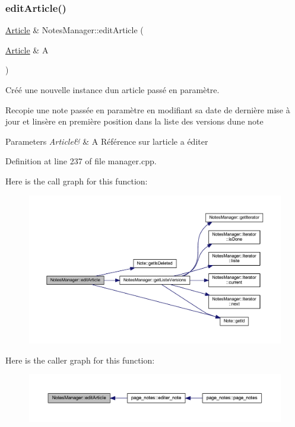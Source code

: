 \subsubsection{\texorpdfstring{edit\+Article()}{editArticle()}}
{\footnotesize\ttfamily \hyperlink{class_article}{Article} \& Notes\+Manager\+::edit\+Article (\begin{DoxyParamCaption}\item[{\hyperlink{class_article}{Article} \&}]{A }\end{DoxyParamCaption})}



Créé une nouvelle instance d\textquotesingle{}un article passé en paramètre. 

Recopie une note passée en paramètre en modifiant sa date de dernière mise à jour et l\textquotesingle{}insère en première position dans la liste des versions d\textquotesingle{}une note 
\begin{DoxyParams}{Parameters}
{\em Article\&} & A Référence sur l\textquotesingle{}article a éditer \\
\hline
\end{DoxyParams}


Definition at line 237 of file manager.\+cpp.

Here is the call graph for this function\+:\nopagebreak
\begin{figure}[H]
\begin{center}
\leavevmode
\includegraphics[width=350pt]{class_notes_manager_a3259c7aa22b5f2eee6f7bceddc707b1d_cgraph}
\end{center}
\end{figure}
Here is the caller graph for this function\+:\nopagebreak
\begin{figure}[H]
\begin{center}
\leavevmode
\includegraphics[width=350pt]{class_notes_manager_a3259c7aa22b5f2eee6f7bceddc707b1d_icgraph}
\end{center}
\end{figure}
\mbox{\label{class_notes_manager_a1c4cfa021a12b6416c4e800d643b5e0a}} 
